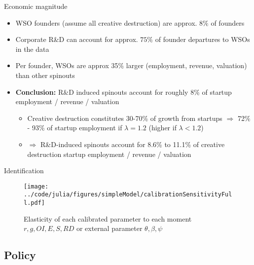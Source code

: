 \documentclass[english,usenames,dvipsnames,handout]{beamer}
\begin{document}
\begin{frame}{Economic magnitude}\label{economic_magnitude}
	\hyperlink{calibration_targets}{}
	\begin{itemize}
		\item WSO founders (assume all creative destruction) are approx. $8\%$ of founders  \hyperlink{results_of_match}{}
		\item Corporate R\&D can account for approx. $75\%$ of founder departures to WSOs in the data \hyperlink{regs_economic_significance}{}
		\item Per founder, WSOs are approx 35\% larger (employment, revenue, valuation) than other spinouts \hyperlink{regs_startup_lifecycle_employment}{} \hyperlink{regs_startup_lifecycle_revenue}{} \hyperlink{regs_startup_lifecycle_valuation}{}  \hyperlink{regs_startup_lifecycle_goingoutofbusiness}{} \hyperlink{regs_startup_lifecycle_successfullyexiting}{} 
		\item \alert{\textbf{Conclusion:}} R\&D induced spinouts account for roughly 8\% of startup employment / revenue / valuation 
		\begin{itemize}
			\item Creative destruction constitutes 30-70\% of growth from startups $\Rightarrow$ 72\% - 93\% of startup employment if $\lambda = 1.2$ (higher if $\lambda < 1.2$)
			\item $\Rightarrow$ R\&D-induced spinouts account for 8.6\% to 11.1\% of creative destruction startup employment / revenue / valuation
		\end{itemize}
	\end{itemize}
\end{frame}

\begin{frame}{Identification}\label{identification}\hyperlink{parameters}{} 
	\begin{figure}
		\texttt{[image: ../code/julia/figures/simpleModel/calibrationSensitivityFull.pdf]}
		\caption{\small Elasticity of each calibrated parameter to each moment $r,g,OI,E,S,RD$ or external parameter $\theta, \beta, \psi$}
	\end{figure}
\end{frame}


\subsection{Policy}
\end{document}
